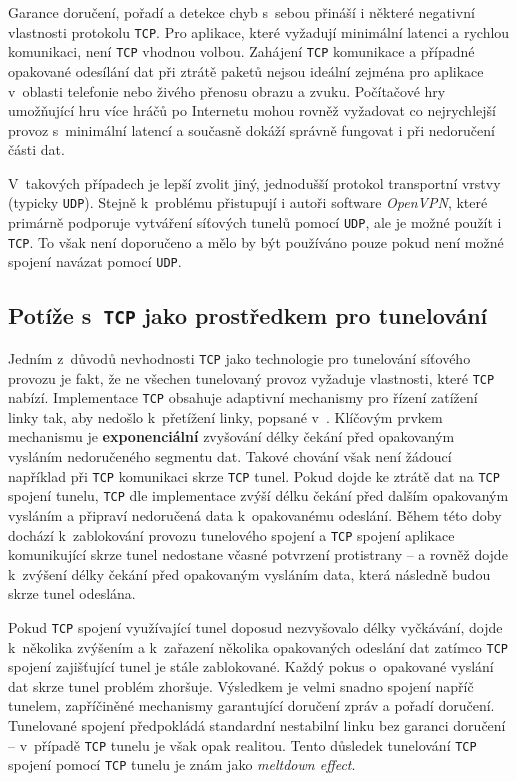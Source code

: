 \documentclass[thesis=M,czech]{FITthesis}[2012/10/20]
\begin{document}
    Garance doručení, pořadí a detekce chyb s~sebou přináší i některé negativní vlastnosti protokolu \texttt{TCP}. Pro aplikace, které vyžadují minimální latenci a rychlou komunikaci, není \texttt{TCP} vhodnou volbou. Zahájení \texttt{TCP} komunikace a případné opakované odesílání dat při ztrátě paketů nejsou ideální zejména pro aplikace v~oblasti telefonie nebo živého přenosu obrazu a zvuku. Počítačové hry umožňující hru více hráčů po Internetu mohou rovněž vyžadovat co nejrychlejší provoz s~minimální latencí a současně dokáží správně fungovat i při nedoručení části dat.
    
    V~takových případech je lepší zvolit jiný, jednodušší protokol transportní vrstvy (typicky \texttt{UDP}). Stejně k~problému přistupují i autoři software \textit{OpenVPN}, které primárně podporuje vytváření síťových tunelů pomocí \texttt{UDP}, ale je možné použít i \texttt{TCP}. To však není doporučeno a mělo by být používáno pouze pokud není možné spojení navázat pomocí \texttt{UDP}.
    
    \subsection{Potíže s~\texttt{TCP} jako prostředkem pro tunelování}
    \label{subsec:tcp-tunnel-issues}
    
    Jedním z~důvodů nevhodnosti \texttt{TCP} jako technologie pro tunelování síťového provozu je fakt, že ne všechen tunelovaný provoz vyžaduje vlastnosti, které \texttt{TCP} nabízí. Implementace \texttt{TCP} obsahuje adaptivní mechanismy pro řízení zatížení linky tak, aby nedošlo k~přetížení linky, popsané v~\cite[RFC 2001]{rfc2001}. Klíčovým prvkem mechanismu je \textbf{exponenciální} zvyšování délky čekání před opakovaným vysláním nedoručeného segmentu dat. Takové chování však není žádoucí například při \texttt{TCP} komunikaci skrze \texttt{TCP} tunel. Pokud dojde ke ztrátě dat na \texttt{TCP} spojení tunelu, \texttt{TCP} dle implementace zvýší délku čekání před dalším opakovaným vysláním a připraví nedoručená data k~opakovanému odeslání. Během této doby dochází k~zablokování provozu tunelového spojení a \texttt{TCP} spojení aplikace komunikující skrze tunel nedostane včasné potvrzení protistrany -- a rovněž dojde k~zvýšení délky čekání před opakovaným vysláním data, která následně budou skrze tunel odeslána.
    
    Pokud \texttt{TCP} spojení využívající tunel doposud nezvyšovalo délky vyčkávání, dojde k~několika zvýšením a k~zařazení několika opakovaných odeslání dat zatímco \texttt{TCP} spojení zajišťující tunel je stále zablokované. Každý pokus o~opakované vyslání dat skrze tunel problém zhoršuje. Výsledkem je velmi snadno  spojení napříč tunelem, zapříčiněné mechanismy garantující doručení zpráv a pořadí doručení. Tunelované spojení předpokládá standardní nestabilní linku bez garanci doručení -- v~případě \texttt{TCP} tunelu je však opak realitou. Tento důsledek tunelování \texttt{TCP} spojení pomocí \texttt{TCP} tunelu je znám jako \textit{meltdown effect}\cite{tcp-over-tcp}.
\end{document}
